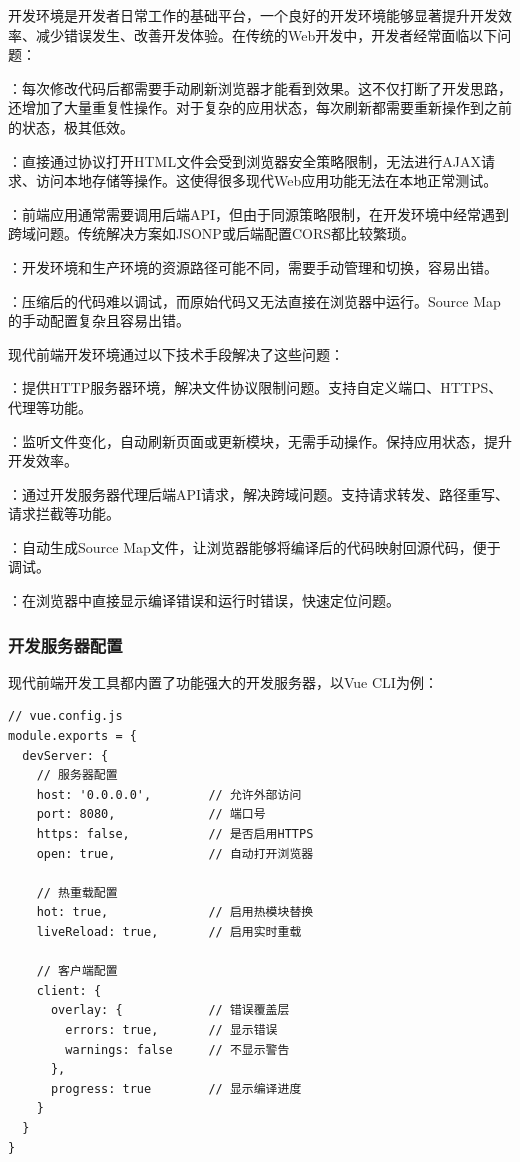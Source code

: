 开发环境是开发者日常工作的基础平台，一个良好的开发环境能够显著提升开发效率、减少错误发生、改善开发体验。在传统的Web开发中，开发者经常面临以下问题：

：每次修改代码后都需要手动刷新浏览器才能看到效果。这不仅打断了开发思路，还增加了大量重复性操作。对于复杂的应用状态，每次刷新都需要重新操作到之前的状态，极其低效。

：直接通过协议打开HTML文件会受到浏览器安全策略限制，无法进行AJAX请求、访问本地存储等操作。这使得很多现代Web应用功能无法在本地正常测试。

：前端应用通常需要调用后端API，但由于同源策略限制，在开发环境中经常遇到跨域问题。传统解决方案如JSONP或后端配置CORS都比较繁琐。

：开发环境和生产环境的资源路径可能不同，需要手动管理和切换，容易出错。

：压缩后的代码难以调试，而原始代码又无法直接在浏览器中运行。Source Map的手动配置复杂且容易出错。

现代前端开发环境通过以下技术手段解决了这些问题：

：提供HTTP服务器环境，解决文件协议限制问题。支持自定义端口、HTTPS、代理等功能。

：监听文件变化，自动刷新页面或更新模块，无需手动操作。保持应用状态，提升开发效率。

：通过开发服务器代理后端API请求，解决跨域问题。支持请求转发、路径重写、请求拦截等功能。

：自动生成Source Map文件，让浏览器能够将编译后的代码映射回源代码，便于调试。

：在浏览器中直接显示编译错误和运行时错误，快速定位问题。

\hypertarget{ux5f00ux53d1ux670dux52a1ux5668ux914dux7f6e}{%
\subsubsection{开发服务器配置}\label{ux5f00ux53d1ux670dux52a1ux5668ux914dux7f6e}}

现代前端开发工具都内置了功能强大的开发服务器，以Vue CLI为例：


\begin{lstlisting}[style=javascript]
// vue.config.js
module.exports = {
  devServer: {
    // 服务器配置
    host: '0.0.0.0',        // 允许外部访问
    port: 8080,             // 端口号
    https: false,           // 是否启用HTTPS
    open: true,             // 自动打开浏览器
    
    // 热重载配置
    hot: true,              // 启用热模块替换
    liveReload: true,       // 启用实时重载
    
    // 客户端配置
    client: {
      overlay: {            // 错误覆盖层
        errors: true,       // 显示错误
        warnings: false     // 不显示警告
      },
      progress: true        // 显示编译进度
    }
  }
}
\end{lstlisting}

